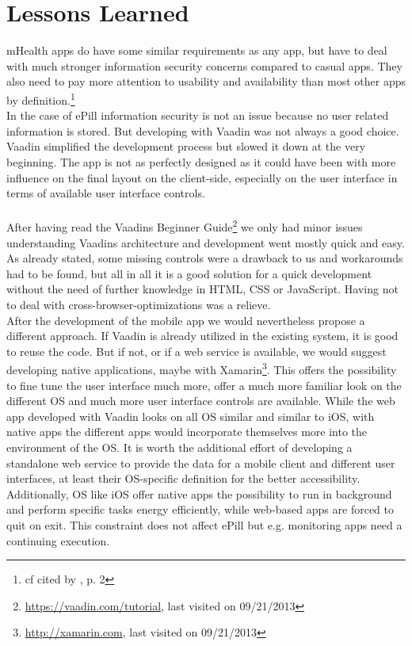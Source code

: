 \section{Lessons Learned}
\label{sec:LessonsLearned}
mHealth apps do have some similar requirements as any app, but have to deal with much stronger information security concerns compared to casual apps. They also need to pay more attention to usability and availability than most other apps by definition.\footnote{cf \cite{WorldHealthOrganization.2011} cited by \cite{MartinezPerez.2013}, p. 2}
\\
In the case of ePill information security is not an issue because no user related information is stored. But developing with Vaadin was not always a good choice. Vaadin simplified the development process but slowed it down at the very beginning. The app is not as perfectly designed as it could have been with more influence on the final layout on the client-side, especially on the user interface in terms of available user interface controls.
\\
\\
After having read the Vaadins Beginner Guide\footnote{\url{https://vaadin.com/tutorial}, last visited on 09/21/2013} we only had minor issues understanding Vaadins architecture and development went mostly quick and easy. As already stated, some missing controls were a drawback to us and workarounds had to be found, but all in all it is a good solution for a quick development without the need of further knowledge in HTML, CSS or JavaScript. Having not to deal with cross-browser-optimizations was a relieve.
\\
After the development of the mobile app we would nevertheless propose a different approach. If Vaadin is already utilized in the existing system, it is good to reuse the code. But if not, or if a web service is available, we would suggest developing native applications, maybe with Xamarin\footnote{\url{http://xamarin.com}, last visited on 09/21/2013}. This offers the possibility to fine tune the user interface much more, offer a much more familiar look on the different OS and much more user interface controls are available. While the web app developed with Vaadin looks on all OS similar and similar to iOS, with native apps the different apps would incorporate themselves more into the environment of the OS. It is worth the additional effort of developing a standalone web service to provide the data for a mobile client and different user interfaces, at least their OS-specific definition for the better accessibility. Additionally, OS like iOS offer native apps the possibility to run in background and perform specific tasks energy efficiently, while web-based apps are forced to quit on exit. This constraint does not affect ePill but e.g. monitoring apps need a continuing execution.
